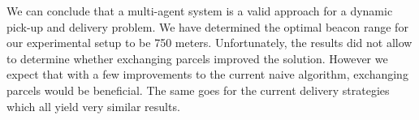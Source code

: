 \documentclass[../main.tex]{subfiles}
\begin{document}
We can conclude that a multi-agent system is a valid approach for a dynamic pick-up and delivery problem. We have determined the optimal beacon range for our experimental setup to be 750 meters. Unfortunately, the results did not allow to determine whether exchanging parcels improved the solution. However we expect that with a few improvements to the current naive algorithm, exchanging parcels would be beneficial. The same goes for the current delivery strategies which all yield very similar results.
\end{document}
